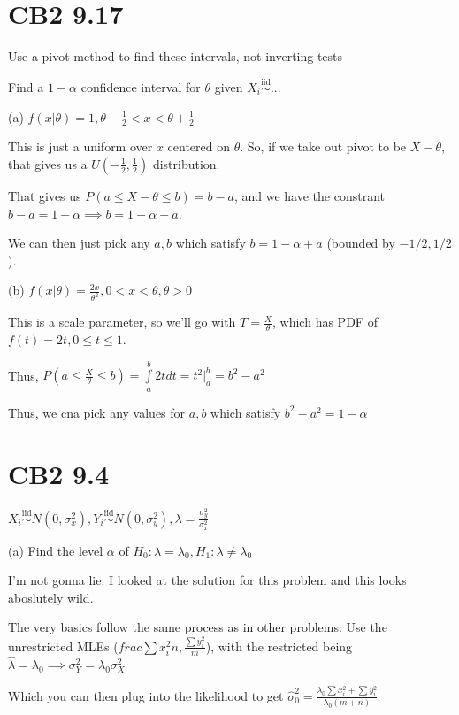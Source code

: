 \documentclass{article}
\let\Oldint=\int
\let\Oldsum=\sum
\renewcommand{\int}{\Oldint\limits}
\renewcommand{\sum}{\Oldsum\limits}
\newcommand{\iiddist}{\overset{\mathrm{iid}}{\sim}}
\begin{document}
\section{CB2 9.17}

Use a pivot method to find these intervals, not inverting tests

Find a $1-\alpha$ confidence interval for $\theta$ given $X_i \iiddist$...

(a) $f(x|\theta) = 1, \theta - \frac{1}{2} < x < \theta + \frac{1}{2}$

This is just a uniform over $x$ centered on $\theta$. So, if we take out pivot to be $X-\theta$, that gives us a $U(-\frac{1}{2}, \frac{1}{2})$ distribution. 

That gives us $P(a \le X-\theta \le b) = b-a$, and we have the constrant $b-a = 1-\alpha \implies b = 1-\alpha + a$. 

We can then just pick any $a, b$ which satisfy $b = 1-\alpha + a$ (bounded by $-1/2, 1/2$).

(b) $f(x|\theta) = \frac{2x}{\theta^2}, 0 < x < \theta, \theta > 0$

This is a scale parameter, so we'll go with $T = \frac{X}{\theta}$, which has PDF of $f(t) = 2t, 0 \le t \le 1$. 

Thus, $P(a \le \frac{X}{\theta} \le b) = \int_a^b 2tdt = t^2|_a^b = b^2 - a^2$

Thus, we cna pick any values for $a,b$ which satisfy $b^2 - a^2 = 1-\alpha$

\section{CB2 9.4}

$X_i \iiddist N(0, \sigma_x^2), Y_i \iiddist N(0, \sigma_y^2), \lambda = \frac{\sigma_y^2}{\sigma_x^2}$

(a) Find the level $\alpha$ of $H_0: \lambda = \lambda_0, H_1: \lambda \neq \lambda_0$

I'm not gonna lie: I looked at the solution for this problem and this looks aboslutely wild. 

The very basics follow the same process as in other problems: Use the unrestricted MLEs ($frac{\sum x_i^2}{n}, \frac{\sum y_i^2}{m}$), with the restricted being $\hat{\lambda} = \lambda_0 \implies \sigma^2_Y = \lambda_0 \sigma^2_X$

Which you can then plug into the likelihood to get $\hat{\sigma}^2_0 = \frac{\lambda_0 \sum x_i^2 + \sum y_i^2}{\lambda_0 (m+n)}$
\end{document}

